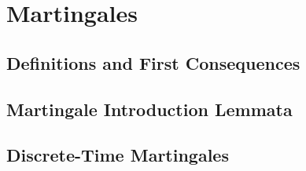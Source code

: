 
\chapter{Martingales}\label{chapter:martingales}

\section{Definitions and First Consequences}
\section{Martingale Introduction Lemmata}
\section{Discrete-Time Martingales}
